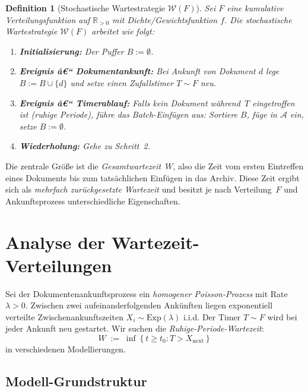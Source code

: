 ﻿\documentclass[12pt, a4paper]{article}
\newtheorem{definition}[theorem]{Definition}
\newcommand{\Exp}{\mathrm{Exp}}
\begin{document}
\begin{definition}[Stochastische Wartestrategie $\mathcal{W}(F)$]
\label{def:waitstrat}
Sei $F$ eine kumulative Verteilungsfunktion auf $\mathbb{R}_{>0}$ mit
Dichte/Gewichtsfunktion $f$. Die \emph{stochastische Wartestrategie}
$\mathcal{W}(F)$ arbeitet wie folgt:

\begin{enumerate}[label=\arabic*.,noitemsep]
  \item \textbf{Initialisierung:} Der Puffer $B := \emptyset$.
  \item \textbf{Ereignis â€“ Dokumentankunft:} Bei Ankunft von Dokument $d$
        lege $B := B \cup \{d\}$ und setze einen Zufallstimer
        $T \sim F$ neu.
  \item \textbf{Ereignis â€“ Timerablauf:} Falls kein Dokument während~$T$
        eingetroffen ist (\emph{ruhige Periode}), führe das
        Batch-Einfügen aus: Sortiere $B$, füge in $\mathcal{A}$ ein,
        setze $B := \emptyset$.
  \item \textbf{Wiederholung:} Gehe zu Schritt~2.
\end{enumerate}
\end{definition}

Die zentrale Größe ist die \emph{Gesamtwartezeit}~$W$, also die Zeit vom
ersten Eintreffen eines Dokuments bis zum tatsächlichen Einfügen in das Archiv.
Diese Zeit ergibt sich als \emph{mehrfach zurückgesetzte Wartezeit} und besitzt
je nach Verteilung~$F$ und Ankunftsprozess unterschiedliche Eigenschaften.

\section{Analyse der Wartezeit-Verteilungen}\label{sec:distributions}

Sei der Dokumentenankunftsprozess ein \emph{homogener Poisson-Prozess} mit
Rate $\lambda > 0$. Zwischen zwei aufeinanderfolgenden Ankünften liegen
exponentiell verteilte Zwischenankunftszeiten $X_i \sim \Exp(\lambda)$
i.i.d. Der Timer $T \sim F$ wird bei jeder Ankunft neu gestartet. Wir suchen
die \emph{Ruhige-Periode-Wartezeit}:
\[
  W \;:=\; \inf\!\left\{t \geq t_0 : T > X_{\text{next}}\right\}
\]
in verschiedenen Modellierungen.

\subsection{Modell-Grundstruktur}
\end{document}
